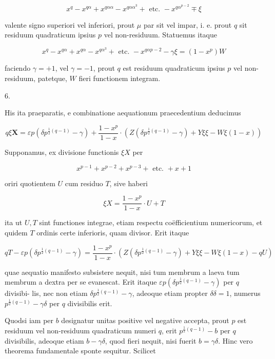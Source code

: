 \documentclass[10pt]{article}
\begin{document}
\[
x^{q}-x^{q \alpha}+x^{q \alpha \alpha}-x^{q \alpha \alpha^{3}}+\text { etc. }-x^{q \alpha^{p-2}} \mp \xi
\]

valente signo superiori vel inferiori, prout \(\mu\) par sit vel impar, i. e. prout \(q\) sit residuum quadraticum ipsius \(p\) vel non-residuum. Statuemus itaque

\[
x^{q}-x^{q \alpha}+x^{q \alpha}-x^{q \alpha^{3}}+\text { etc. }-x^{q \alpha p-2}-\gamma \xi=\left(1-x^{p}\right) W
\]

faciendo \(\gamma=+1\), vel \(\gamma=-1\), prout \(q\) est residuum quadraticum ipsius \(p\) vel non-residuum, patetque, \(W\) fieri functionem integram.

6.

His ita praeparatis, e combinatione aequationum praecedentium deducimus

\[
q \xi \boldsymbol{X}=\varepsilon p\left(\delta p^{\frac{1}{2}(q-1)}-\gamma\right)+\frac{1-x^{p}}{1-x} \cdot\left(Z\left(\delta p^{\frac{1}{2}(q-1)}-\gamma\right)+Y \xi \xi-W \xi(1-x)\right)
\]

Supponamus, ex divisione functionis \(\xi X\) per

\[
x^{p-1}+x^{p-2}+x^{p-3}+\text { etc. }+x+1
\]

oriri quotientem \(U\) cum residuo \(T\), sive haberi

\[
\xi X=\frac{1-x^{p}}{1-x} \cdot U+T
\]

ita ut \(U, T\) sint functiones integrae, etiam respectu coëfficientium numericorum, et quidem \(T\) ordinis certe inferioris, quam divisor. Erit itaque

\[
q T-\varepsilon p\left(\delta p^{\frac{1}{2}(q-1)}-\gamma\right)=\frac{1-x^{p}}{1-x} \cdot\left(Z\left(\delta p^{\frac{1}{2}(q-1)}-\gamma\right)+Y \xi \xi-W \xi(1-x)-q U\right)
\]

quae aequatio manifesto subsistere nequit, nisi tum membrum a laeva tum membrum a dextra per se evanescat. Erit itaque \(\varepsilon p\left(\delta p^{\frac{1}{2}(q-1)}-\gamma\right)\) per \(q\) divisibi-
lis, nec non etiam \(\delta p^{\frac{1}{2}(q-1)}-\gamma\), adeoque etiam propter \(\delta \delta=1\), numerus \(p^{\frac{1}{2}(q-1)}-\gamma \delta\) per \(q\) divisibilis erit.

Quodsi iam per \(b\) designatur unitas positive vel negative accepta, prout \(p\) est residuum vel non-residuum quadraticum numeri \(q\), erit \(p^{\frac{1}{2}(q-1)}-b\) per \(q\) divisibilis, adeoque etiam \(b-\gamma \delta\), quod fieri nequit, nisi fuerit \(b=\gamma \delta\). Hinc vero theorema fundamentale sponte sequitur. Scilicet
\end{document}
